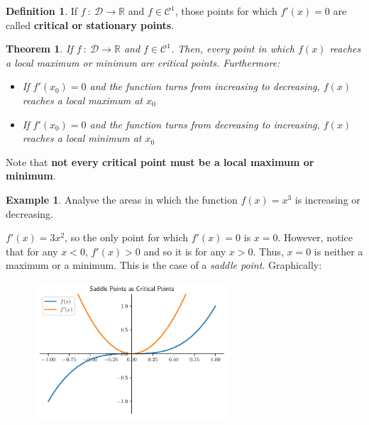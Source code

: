 \documentclass[a4paper,11pt]{article}
\theoremstyle{definition}
\newtheorem{definition}{Definition}
\newtheorem{example}{Example}
\theoremstyle{plain}
\newtheorem{theorem}{Theorem}
\begin{document}
\begin{definition}
If \(f \ : \ \mathcal{D}\rightarrow\mathbb{R}\) and
\(f\in\mathcal{C}^1\), those points for which \(f'(x) = 0\) are called
\textbf{critical or stationary points}.
\end{definition}

\begin{theorem}
If \(f \ : \ \mathcal{D}\rightarrow\mathbb{R}\) and
\(f\in\mathcal{C}^1\). Then, every point in which \(f(x)\) reaches a
local maximum or minimum are critical points. Furthermore:

\begin{itemize}
    \item If \(f'(x_0) = 0\) and the function turns from increasing to decreasing,
\(f(x)\) reaches a local maximum at \(x_0\) 

    \item If \(f'(x_0) = 0\) and the function turns from decreasing to increasing, \(f(x)\) reaches a local minimum at \(x_0\)
\end{itemize}
\end{theorem}

Note that \textbf{not every critical point must be a local maximum or
minimum}.

\begin{example}
Analyse the areas in which the function \(f(x) = x^3\)
is increasing or decreasing.

\(f'(x) = 3x^2\), so the only point for which \(f'(x) = 0\) is
\(x = 0\). However, notice that for any \(x < 0\), \(f'(x) > 0\) and so
it is for any \(x > 0\). Thus, \(x = 0\) is neither a maximum or a
minimum. This is the case of a \emph{saddle point}. Graphically:
\end{example}

    \begin{figure}[htbp]
    	\centering 
    		\includegraphics[width = 0.65\textwidth]{Ch2_files/Ch2_21_0.pdf}
    \end{figure}
    
\end{document}
